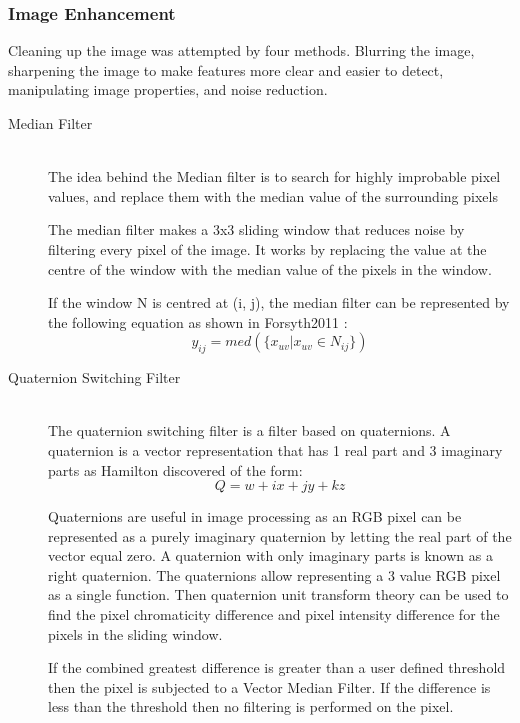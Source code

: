 \subsubsection{Image Enhancement}
Cleaning up the image was attempted by four methods. Blurring the image, sharpening the image to make features more clear and easier to detect, manipulating image properties, and noise reduction. 
\begin{description}
\item[Median Filter]\hfill \\The idea behind the Median filter is to search for highly improbable pixel values, and replace them with the median value of the surrounding pixels \cite{davies2012computer}

The median filter makes a 3x3 sliding window that reduces noise by filtering every pixel of the image. It works by replacing the value at the centre of the window with the median value of the pixels in the window.

If the window N is centred at (i, j), the median filter can be represented by the following equation as shown in Forsyth2011 \cite{forsyth2011computer}:
\begin{equation}
y_{ij}=med(\lbrace x_{uv}|x_{uv}\in N_{ij} \rbrace)
\end{equation}

\item[Quaternion Switching Filter]\hfill \\
The quaternion switching filter \cite{web:QNSF} is a filter based on quaternions.
A quaternion is a vector representation that has 1 real part and 3 imaginary parts as Hamilton discovered \cite{article:Hamilton1844} of the form:
\begin{equation}
Q=w+ix+jy+kz
\end{equation} 

Quaternions are useful in image processing as an RGB pixel can be represented as a purely imaginary quaternion by letting the real part of the vector equal zero. A quaternion with only imaginary parts is known as a right quaternion.\cite{article:Hamilton1866}
The quaternions allow representing a 3 value RGB pixel as a single function. Then quaternion unit transform theory can be used to find the pixel chromaticity difference and pixel intensity difference for the pixels in the sliding window.

If the combined greatest difference is greater than a user defined threshold then the pixel is subjected to a Vector Median Filter. If the difference is less than the threshold then no filtering is performed on the pixel.
\end{description}
 
